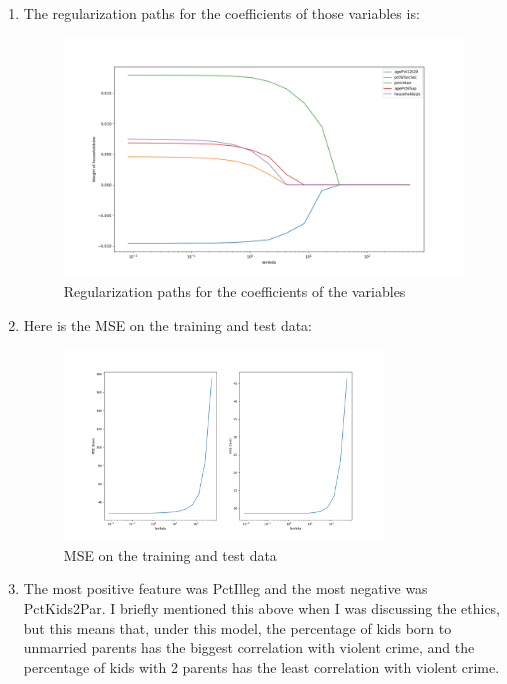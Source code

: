 \documentclass[12pt]{article}
\theoremstyle{definitionstyle}
\begin{document}
\begin{enumerate}[label=\alph*.]
        \item The regularization paths for the coefficients of those variables is:
        \begin{figure}[H]
            \centering
            \includegraphics[width=\textwidth]{features_weight.png}
            \caption{Regularization paths for the coefficients of the variables}
        \end{figure}

        \item Here is the MSE on the training and test data:
        \begin{figure}[H]
            \centering
            \includegraphics[width=0.8\textwidth]{MSE_crime.png}
            \caption{MSE on the training and test data}
        \end{figure}

        \item The most positive feature was PctIlleg and the most negative was PctKids2Par. I briefly mentioned this above when I was discussing the ethics, but this means that, under this model, the percentage of kids born to unmarried parents has the biggest correlation with violent crime, and the percentage of kids with 2 parents has the least correlation with violent crime.
        

\end{enumerate}
\end{document}
